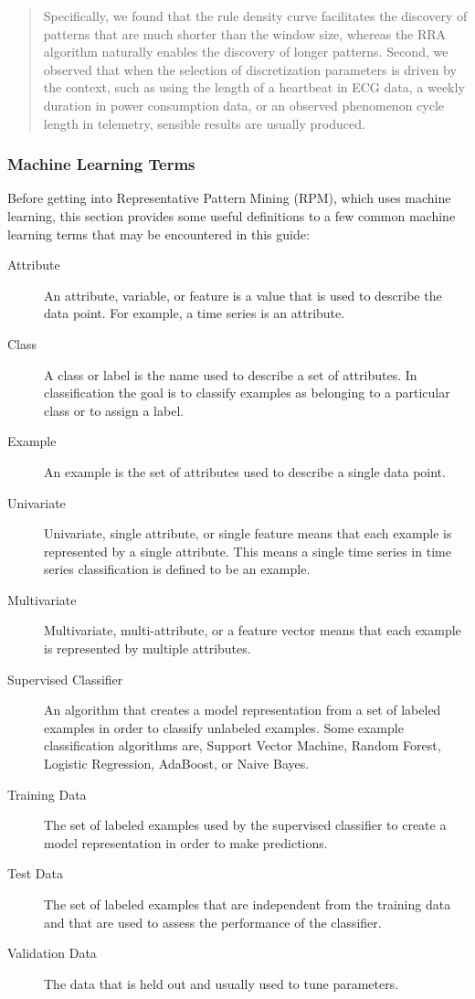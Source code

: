 \documentclass[titlepage, letterpaper, 12pt]{article}
\begin{document}
\begin{quote}
	Specifically, we found that the rule density curve facilitates the discovery of patterns that are much shorter than the window size, whereas the RRA algorithm naturally enables the discovery of longer patterns. Second, we observed that when the selection of discretization parameters is driven by the context, such as using the length of a heartbeat in ECG data, a weekly duration in power consumption data, or an observed phenomenon cycle length in telemetry, sensible results are usually produced.
\end{quote}


\subsubsection{Machine Learning Terms}
\label{MLTerms}

Before getting into Representative Pattern Mining (RPM), which uses machine learning, this section provides some useful definitions to a few common machine learning terms that may be encountered in this guide:

\begin{description}
	\item[Attribute] An attribute, variable, or feature is a value that is used to describe the data point.  For example, a time series is an attribute.
	\item[Class] A class or label is the name used to describe a set of attributes.  In classification the goal is to classify examples as belonging to a particular class or to assign a label.
	\item[Example] An example is the set of attributes used to describe a single data point.
	\item[Univariate] Univariate, single attribute, or single feature means that each example is represented by a single attribute.  This means a single time series in time series classification is defined to be an example.
	\item[Multivariate] Multivariate, multi-attribute, or a feature vector means that each example is represented by multiple attributes.
	\item[Supervised Classifier] An algorithm that creates a model representation from a set of labeled examples in order to classify unlabeled examples.  Some example classification algorithms are, Support Vector Machine, Random Forest, Logistic Regression, AdaBoost, or Naive Bayes.
	\item[Training Data] The set of labeled examples used by the supervised classifier to create a model representation in order to make predictions.
	\item[Test Data] The set of labeled examples that are independent from the training data and that are used to assess the performance of the classifier.
	\item[Validation Data] The data that is held out and usually used to tune parameters.
\end{description}
\end{document}
